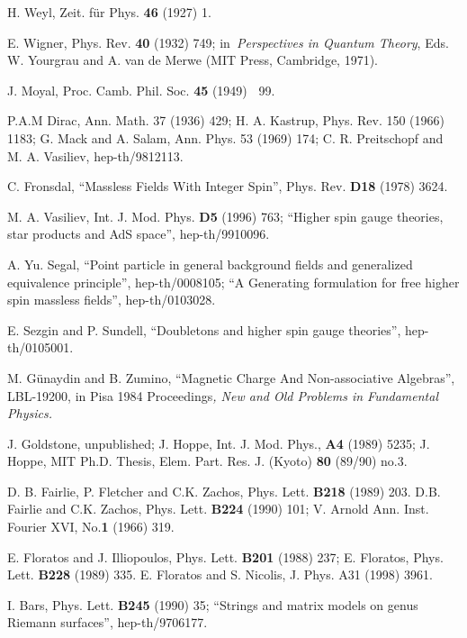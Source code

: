 \documentclass[a4paper,12pt]{article}
\begin{document}
\begin{thebibliography}{99}
  H. Weyl, Zeit. f\"ur Phys. \textbf{46} (1927) 1.

  E. Wigner, Phys. Rev. \textbf{40} (1932) 749; in\textit{\
Perspectives in Quantum Theory}, Eds. W. Yourgrau and A. van de Merwe (MIT
Press, Cambridge, 1971).

  J. Moyal, Proc. Camb. Phil. Soc. \textbf{45 }(1949)\textbf{%
\ }99.

  P.A.M Dirac, Ann. Math. 37 (1936) 429; H. A. Kastrup, Phys.
Rev. 150 (1966) 1183; G. Mack and A. Salam, Ann. Phys. 53 (1969) 174; C. R.
Preitschopf and M. A. Vasiliev, hep-th/9812113.

  C. Fronsdal, ``Massless Fields With Integer Spin'',
Phys. Rev. \textbf{D18} (1978) 3624.

  M. A. Vasiliev, Int. J. Mod. Phys. \textbf{D5 }(1996) 763;
``Higher spin gauge theories, star products and AdS space'', hep-th/9910096.

  A. Yu. Segal, ``Point particle in general background fields
and generalized equivalence principle'', hep-th/0008105; ``A Generating
formulation for free higher spin massless fields'', hep-th/0103028.

  E. Sezgin and P. Sundell, ``Doubletons and higher spin
gauge theories'', hep-th/0105001.

  M. G\"{u}naydin and B. Zumino, ``Magnetic Charge And
Non-associative Algebras'', LBL-19200, in Pisa 1984 Proceedings\textit{, New
and Old Problems in Fundamental Physics.}

  J. Goldstone, unpublished; J. Hoppe, Int. J. Mod. Phys., 
\textbf{A4} (1989) 5235; J. Hoppe, MIT Ph.D. Thesis, Elem. Part. Res. J.
(Kyoto) \textbf{80} (89/90) no.3.

  D. B. Fairlie, P. Fletcher and C.K. Zachos, Phys. Lett. 
\textbf{B218} (1989) 203. D.B. Fairlie and C.K. Zachos, Phys. Lett. \textbf{%
B224} (1990) 101; V. Arnold Ann. Inst. Fourier XVI, No.\textbf{1} (1966) 319.

  E. Floratos and J. Illiopoulos, Phys. Lett. \textbf{B201}
(1988) 237; E. Floratos, Phys. Lett. \textbf{B228} (1989) 335. E. Floratos
and S. Nicolis, J. Phys. A31 (1998) 3961.

  I. Bars, Phys. Lett. \textbf{B245} (1990) 35; ``Strings
and matrix models on genus \myHighlight{$g$}\coordHE{} Riemann surfaces'', hep-th/9706177.


\end{thebibliography}
\end{document}
